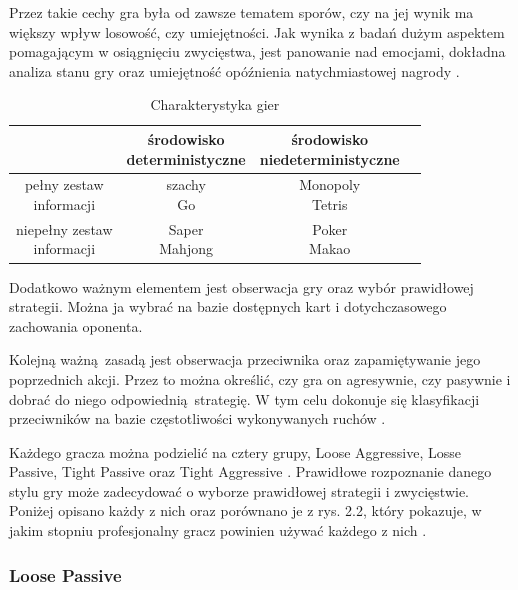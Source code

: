 \documentclass[12pt,oneside,a4paper]{report}
\begin{document}
Przez takie cechy gra była od zawsze tematem sporów, czy na jej wynik ma większy wpływ
losowość, czy umiejętności. Jak wynika z badań dużym aspektem pomagającym w osiągnięciu zwycięstwa,
jest panowanie nad emocjami, dokładna analiza stanu gry oraz umiejętność opóźnienia natychmiastowej
nagrody \cite{theory poker}.

\begin{table}[h!]
\centering
\caption{Charakterystyka gier}
\begin{tabular}{|c|c|c|c| }
   \hline
    & \makecell{środowisko \\ deterministyczne} & \makecell{środowisko \\ niedeterministyczne} \\
    \hline
   \makecell{pełny zestaw \\ informacji} &  \makecell{szachy \\ Go } & \makecell{Monopoly \\ Tetris }\\ 
   \hline
   \makecell{niepełny zestaw \\ informacji} &  \makecell{Saper \\ Mahjong } & \makecell{Poker \\
   Makao}  \\  
   \hline
\end{tabular}
\end{table}

\vspace{6cm}
Dodatkowo ważnym elementem jest obserwacja gry oraz wybór prawidłowej strategii.
Można ja wybrać na bazie dostępnych kart i dotychczasowego zachowania oponenta.

Kolejną ważną zasadą jest obserwacja przeciwnika oraz zapamiętywanie jego
poprzednich akcji. Przez to można określić, czy gra on agresywnie, czy pasywnie i dobrać do 
niego odpowiednią strategię. W tym celu dokonuje się klasyfikacji przeciwników na 
bazie częstotliwości wykonywanych ruchów \cite{class}.

Każdego gracza można podzielić na cztery grupy, Loose Aggressive, Losse Passive, Tight
Passive oraz Tight Aggressive \cite{class}. Prawidłowe rozpoznanie danego stylu gry
może zadecydować o wyborze prawidłowej strategii i zwycięstwie. Poniżej opisano każdy z nich oraz
porównano je z rys. 2.2, który pokazuje, w jakim stopniu profesjonalny gracz powinien używać każdego
z nich \cite{class}. 

\subsubsection{Loose Passive}
\end{document}
